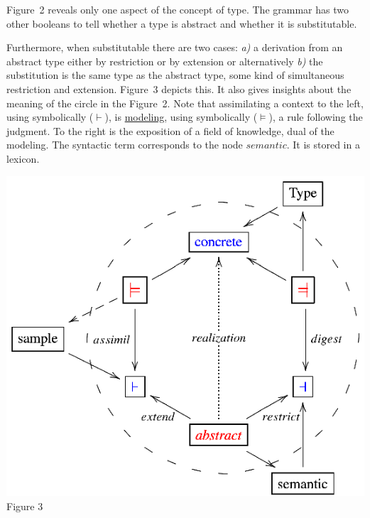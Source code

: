Figure~2 reveals only one aspect of the concept of type. The grammar has two other booleans to tell whether a type is abstract and whether it is substitutable.\\ 
\noindent
\begin{minipage}[h]{5.2cm}
\indent
Furthermore, when substitutable there are two cases: {\it a)} a derivation from an abstract type either by restriction or by extension or alternatively {\it b)} the substitution is the same type as the abstract type, some kind of simultaneous restriction and extension. Figure~3 depicts this. It also gives insights about the meaning of the circle in the Figure~2. Note that assimilating a context to the left, using symbolically ($\vdash$), is \underline{modeling}, using symbolically ($\models$), a rule following the judgment. To the right is the exposition of a field of knowledge, dual of the modeling. The syntactic term corresponds to the node $semantic$. It is stored in a lexicon.

\end{minipage}
\begin{minipage}[h]{8.8cm}
 \begin{center}

  \includegraphics[]{part8/Viallefond_P52/P52_3.eps}
\\ Figure 3

 \end{center}
\end{minipage}
\hfill

